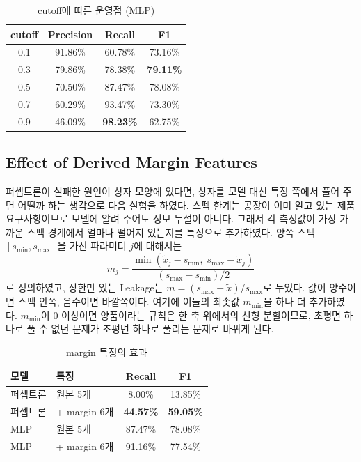 \documentclass[10pt,twocolumn,a4paper]{article}
\begin{document}
\begin{table}[t]
\centering\small
\caption{cutoff에 따른 운영점 (MLP)}
\label{tab:cutoff}
\begin{tabular}{cccc}
\toprule
cutoff & Precision & Recall & F1 \\
\midrule
0.1 & 91.86\% & 60.78\% & 73.16\% \\
0.3 & 79.86\% & 78.38\% & \textbf{79.11\%} \\
0.5 & 70.50\% & 87.47\% & 78.08\% \\
0.7 & 60.29\% & 93.47\% & 73.30\% \\
0.9 & 46.09\% & \textbf{98.23\%} & 62.75\% \\
\bottomrule
\end{tabular}
\end{table}

\subsection{Effect of Derived Margin Features}

퍼셉트론이 실패한 원인이 상자 모양에 있다면, 상자를 모델 대신 특징 쪽에서 풀어 주면 어떨까
하는 생각으로 다음 실험을 하였다. 스펙 한계는 공장이 이미 알고 있는 제품 요구사항이므로 모델에
알려 주어도 정보 누설이 아니다. 그래서 각 측정값이 가장 가까운 스펙 경계에서 얼마나 떨어져
있는지를 특징으로 추가하였다. 양쪽 스펙 $[s_{\min}, s_{\max}]$을 가진 파라미터 $j$에 대해서는
\begin{equation}
  m_j = \frac{\min(\tilde{x}_j - s_{\min},\; s_{\max} - \tilde{x}_j)}{(s_{\max} - s_{\min})/2}
\end{equation}
로 정의하였고, 상한만 있는 Leakage는 $m = (s_{\max} - \tilde{x})/s_{\max}$로 두었다. 값이
양수이면 스펙 안쪽, 음수이면 바깥쪽이다. 여기에 이들의 최솟값 $m_{\min}$을 하나 더 추가하였다.
$m_{\min}$이 0 이상이면 양품이라는 규칙은 한 축 위에서의 선형 분할이므로, 초평면 하나로 풀 수
없던 문제가 초평면 하나로 풀리는 문제로 바뀌게 된다.

\begin{table}[t]
\centering\small
\caption{margin 특징의 효과}
\label{tab:margin}
\begin{tabular}{llcc}
\toprule
모델 & 특징 & Recall & F1 \\
\midrule
퍼셉트론 & 원본 5개 & 8.00\% & 13.85\% \\
퍼셉트론 & + margin 6개 & \textbf{44.57\%} & \textbf{59.05\%} \\
MLP & 원본 5개 & 87.47\% & 78.08\% \\
MLP & + margin 6개 & 91.16\% & 77.54\% \\
\bottomrule
\end{tabular}
\end{table}
\end{document}
